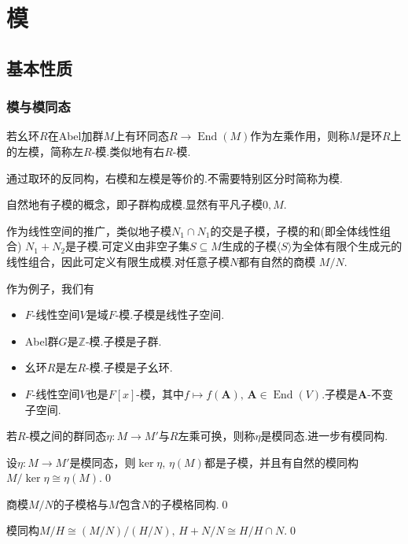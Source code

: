 \chapter{模}
\section{基本性质}
\subsection{模与模同态}
\begin{definition}
    若幺环$R$在Abel加群$M$上有环同态$R\to\operatorname*{End}(M)$作为左乘作用，则称$M$是环$R$上的{\heiti 左模}，简称{\heiti 左$R$-模}.类似地有右$R$-模.
\end{definition}
\begin{remark}
    通过取环的反同构，右模和左模是等价的.不需要特别区分时简称为模.
\end{remark}

自然地有{\heiti 子模}的概念，即子群构成模.显然有平凡子模$0,M$.

作为线性空间的推广，类似地子模$N_1\cap N_1$的交是子模，子模的和(即全体线性组合) $N_1+N_2$是子模.可定义由非空子集$S\subseteq M$生成的子模$\langle S\rangle $为全体有限个生成元的线性组合，因此可定义{\heiti 有限生成模}.对任意子模$N$都有自然的{\heiti 商模} $M/N$.

作为例子，我们有
\begin{itemize}
    \item $F$-线性空间$V$是域$F$-模.子模是线性子空间.
    \item Abel群$G$是$\mathbb{Z}$-模.子模是子群.
    \item 幺环$R$是左$R$-模.子模是子幺环.
    \item $F$-线性空间$V$也是$F[x]$-模，其中$f\mapsto f(\bm A),\,\bm A\in\operatorname*{End}(V)$.子模是$\bm A$-不变子空间.
\end{itemize}

\begin{definition}
    若$R$-模之间的群同态$\eta\colon M\to M'$与$R$左乘可换，则称$\eta$是{\heiti 模同态}.进一步有{\heiti 模同构}.
\end{definition}

\begin{thm}[(模同态基本定理)]
    设$\eta\colon M\to M'$是模同态，则$\ker\eta,\,\eta(M)$都是子模，并且有自然的模同构$M/\ker\eta\cong\eta(M)$.\qed
\end{thm}
\begin{cor*}
    商模$M/N$的子模格与$M$包含$N$的子模格同构.\qed
\end{cor*}
\begin{cor*}
    模同构$M/H\cong(M/N)/(H/N),\,H+N/N\cong H/H\cap N$.\qed
\end{cor*}

